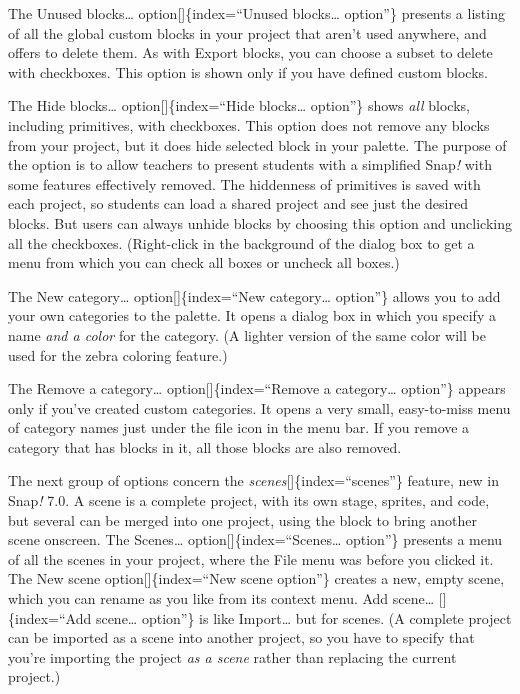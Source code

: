 \documentclass[
  letterpaper,
]{book}
\begin{document}
The Unused blocks\ldots{} option{[}{]}\{index=``Unused blocks\ldots{}
option''\} presents a listing of all the global custom blocks in your
project that aren't used anywhere, and offers to delete them. As with
Export blocks, you can choose a subset to delete with checkboxes. This
option is shown only if you have defined custom blocks.

The Hide blocks\ldots{} option{[}{]}\{index=``Hide blocks\ldots{}
option''\} shows \emph{all} blocks, including primitives, with
checkboxes. This option does not remove any blocks from your project,
but it does hide selected block in your palette. The purpose of the
option is to allow teachers to present students with a simplified
Snap\emph{!} with some features effectively removed. The hiddenness of
primitives is saved with each project, so students can load a shared
project and see just the desired blocks. But users can always unhide
blocks by choosing this option and unclicking all the checkboxes.
(Right-click in the background of the dialog box to get a menu from
which you can check all boxes or uncheck all boxes.)

The New category\ldots{} option{[}{]}\{index=``New category\ldots{}
option''\} allows you to add your own categories to the palette. It
opens a dialog box in which you specify a name \emph{and a color} for
the category. (A lighter version of the same color will be used for the
zebra coloring feature.)

The Remove a category\ldots{} option{[}{]}\{index=``Remove a
category\ldots{} option''\} appears only if you've created custom
categories. It opens a very small, easy-to-miss menu of category names
just under the file icon in the menu bar. If you remove a category that
has blocks in it, all those blocks are also removed.

The next group of options concern the
\emph{scenes}{[}{]}\{index=``scenes''\} feature, new in Snap\emph{!}
7.0. A scene is a complete project, with its own stage, sprites, and
code, but several can be merged into one project, using the block to
bring another scene onscreen. The Scenes\ldots{}
option{[}{]}\{index=``Scenes\ldots{} option''\} presents a menu of all
the scenes in your project, where the File menu was before you clicked
it. The New scene option{[}{]}\{index=``New scene option''\} creates a
new, empty scene, which you can rename as you like from its context
menu. Add scene\ldots{} {[}{]}\{index=``Add scene\ldots{} option''\} is
like Import\ldots{} but for scenes. (A complete project can be imported
as a scene into another project, so you have to specify that you're
importing the project \emph{as a scene} rather than replacing the
current project.)
\end{document}
